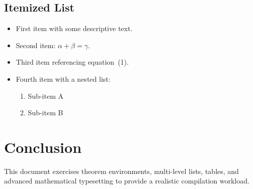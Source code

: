 \documentclass[12pt]{article}
\begin{document}
\subsection{Itemized List}
\begin{itemize}
  \item First item with some descriptive text.
  \item Second item: $\alpha + \beta = \gamma$.
  \item Third item referencing equation~(1).
  \item Fourth item with a nested list:
    \begin{enumerate}
      \item Sub-item A
      \item Sub-item B
    \end{enumerate}
\end{itemize}

\section{Conclusion}
This document exercises theorem environments, multi-level lists, tables, and
advanced mathematical typesetting to provide a realistic compilation workload.
\end{document}
